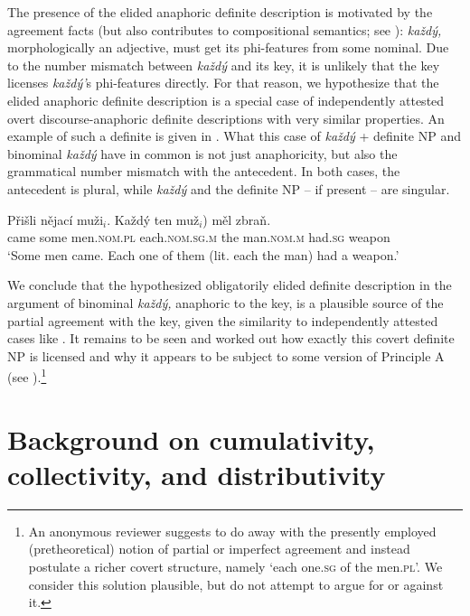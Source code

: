 \documentclass[output=paper,colorlinks,citecolor=brown,newtxmath]{langscibook}
\begin{document}
The presence of the elided anaphoric definite description is motivated by the agreement facts (but also contributes to compositional semantics; see ): \textit{každý,} morphologically an adjective, must get its phi-features from some nominal. Due to the number mismatch between \textit{každý} and its key, it is unlikely that the key licenses \textit{každý'}s phi-features directly. For that reason, we hypothesize that the elided anaphoric definite description is a special case of independently attested overt discourse-anaphoric definite descriptions with very similar properties. An example of such a definite is given in . What this case of \textit{každý} + definite NP and binominal \textit{každý} have in common is not just anaphoricity, but also the grammatical number mismatch with the antecedent. In both cases, the antecedent is plural, while \textit{každý} and the definite NP -- if present -- are singular.

\ea\label{ex:disc-an}\gll Přišli nějací muži\(_i\). Každý \minsp{(} ten
muž\(_i\)) měl zbraň.\\
came some men.\textsc{nom.pl} each.\textsc{nom.sg.m} {} the man.\textsc{nom.m}
had.\textsc{sg} weapon\\
\glt `Some men came. Each one of them (lit. each the man) had a weapon.'
\z

\noindent We conclude that the hypothesized obligatorily elided definite description in the argument of binominal \textit{každý,} anaphoric to the key, is a plausible source of the partial agreement with the key, given the similarity to independently attested cases like . It remains to be seen and worked out how exactly this covert definite NP is licensed and why it appears to be subject to some version of Principle A (see ).\footnote{An anonymous reviewer suggests to do away with the presently employed (pretheoretical) notion of partial or imperfect agreement and instead postulate a richer covert structure, namely `each one.\textsc{sg} of the men.\textsc{pl}'. We consider this solution plausible, but do not attempt to argue for or against it.\label{fn:partial-agreement}}


\section{Background on cumulativity, collectivity, and distributivity}\label{semantic-properties}
\end{document}
